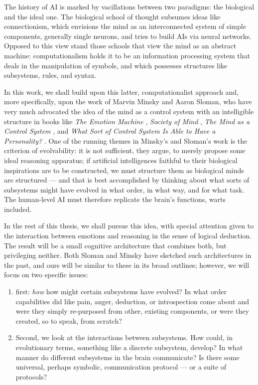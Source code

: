 The history of AI is marked by vacillations between two paradigms: the biological and the ideal one. The biological school of thought subsumes ideas like connectionism, which envisions the mind as an interconnected system of simple components, generally single neurons, and tries to build AIs via neural networks. Opposed to this view stand those schools that view the mind as an abstract machine: computationalism holds it to be an information processing system that deals in the manipulation of symbols, and which possesses structures like subsystems, rules, and syntax.

In this work, we shall build upon this latter, computationalist approach and, more specifically, upon the work of Marvin Minsky and Aaron Sloman, who have very much advocated the idea of the mind as a control system with an intelligible structure in books like {\em The Emotion Machine} \cite{emotionMachine}, {\em Society of Mind} \cite{societyOfMind}, {\em The Mind as a Control System} \cite{sloman1993}, and {\em What Sort of Control System Is Able to Have a Personality?} \cite{sloman1997}. One of the running themes in Minsky's and Sloman's work is the criterion of evolvability: it is not sufficient, they argue, to merely propose some ideal reasoning apparatus; if artificial intelligences faithful to their biological inspirations are to be constructed, we must structure them as biological minds are structured --- and that is best accomplished by thinking about what sorts of subsystems might have evolved in what order, in what way, and for what task. The human-level AI must therefore replicate the brain's functions, warts included.

In the rest of this thesis, we shall pursue this idea, with special attention given to the interaction between emotions and reasoning in the sense of logical deduction. The result will be a small cognitive architecture that combines both, but privileging neither. Both Sloman and Minsky have sketched such architectures in the past, and ours will be similar to these in its broad outlines; however, we will focus on two specific issues:

\begin{enumerate}
	\item first: \emph{how} how might certain subsystems have evolved? In what order capabilities did like pain, anger, deduction, or introspection come about and were they simply re-purposed from other, existing components, or were they created, so to speak, from scratch?
	\item Second, we look at the interactions between subsystems. How could, in evolutionary terms, something like a discrete subsystem, develop? In what manner do different subsystems in the brain communicate? Is there some universal, perhaps symbolic, communication protocol --- or a suite of protocols?
\end{enumerate}

